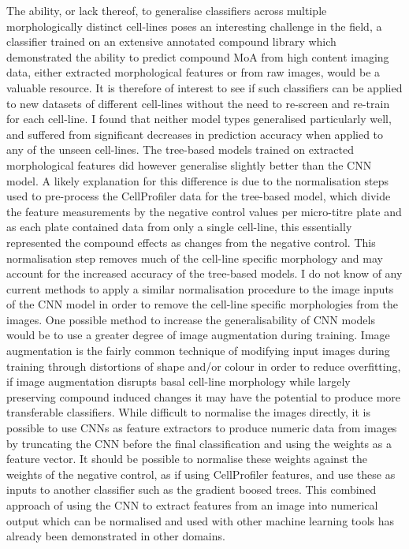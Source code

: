 \documentclass[a4paper,11pt,twoside,openright]{scrbook}
\begin{document}
The ability, or lack thereof, to generalise classifiers across multiple morphologically distinct cell-lines poses an 
interesting challenge in the field, a classifier trained on an extensive annotated compound library which demonstrated 
the ability to predict compound MoA from high content imaging data, either extracted morphological features or from raw 
images, would be a valuable resource.
It is therefore of interest to see if such classifiers can be applied to new datasets of different cell-lines without 
the need to re-screen and re-train for each cell-line.
I found that neither model types generalised particularly well, and suffered from significant decreases in prediction 
accuracy when applied to any of the unseen cell-lines.
The tree-based models trained on extracted morphological features did however generalise slightly better than the CNN 
model.
A likely explanation for this difference is due to the normalisation steps used to pre-process the CellProfiler data 
for the tree-based model, which divide the feature measurements by the negative control values per micro-titre plate 
and as each plate contained data from only a single cell-line, this essentially represented the compound effects as 
changes from the negative control.
This normalisation step removes much of the cell-line specific morphology and may account for the increased accuracy of 
the tree-based models.
I do not know of any current methods to apply a similar normalisation procedure to the image inputs of the CNN model in 
order to remove the cell-line specific morphologies from the images.
One possible method to increase the generalisability of CNN models would be to use a greater degree of image 
augmentation during training.
Image augmentation is the fairly common technique of modifying input images during training through distortions of 
shape and/or colour in order to reduce overfitting, \cite{Perez2017,Bloice2017} if image augmentation disrupts basal 
cell-line morphology while largely preserving compound induced changes it may have the potential to produce more 
transferable classifiers.
While difficult to normalise the images directly, it is possible to use CNNs as feature extractors to produce numeric 
data from images by truncating the CNN before the final classification and using the weights as a feature vector.
It should be possible to normalise these weights against the weights of the negative control, as if using CellProfiler 
features, and use these as inputs to another classifier such as the gradient boosed trees.
This combined approach of using the CNN to extract features from an image into numerical output which can be normalised 
and used with other machine learning tools has already been demonstrated in other domains. \cite{Dario2018}
\end{document}
